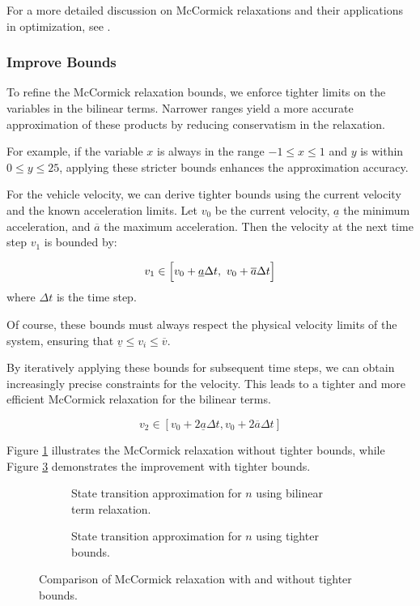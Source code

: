 For a more detailed discussion on McCormick relaxations and their applications in optimization, see
\cite{mccormick_computability_1976,belotti_branching_2009}.

\subsubsection{Improve Bounds}

To refine the McCormick relaxation bounds, we enforce tighter limits on the variables in the bilinear terms.
Narrower ranges yield a more accurate approximation of these products by reducing conservatism in the relaxation.

For example, if the variable $ x $ is always in the range $-1 \leq x \leq 1$ and $ y $ is within $ 0 \leq y \leq 25 $, applying these stricter bounds
enhances the approximation accuracy.

For the vehicle velocity, we can derive tighter bounds using the current velocity and the known acceleration limits.
Let $ v_0 $ be the current velocity, $\underline{a}$ the minimum acceleration, and $\overline{a}$ the maximum acceleration.
Then the velocity at the next time step $ v_1 $ is bounded by:

\[ v_1 \in \Bigl[v_0 + \underline{a}\Delta t,\ v_0 +
		\overline{a}\Delta t\Bigr] \] where $ \Delta t $ is the time step.

Of course, these bounds must always respect the physical velocity limits of the system, ensuring that $\underline{v} \leq v_i \leq \overline{v}$.

By iteratively applying these bounds for subsequent time steps, we can obtain increasingly precise constraints for the velocity.
This leads to a tighter and more efficient McCormick relaxation for the bilinear terms.

\[ v_2 \in [v_0 + 2\underline{a} \Delta t, v_0 +
		2\overline{a} \Delta t] \]

Figure \ref{fig:mccormick_problem} illustrates the McCormick relaxation without tighter bounds, while Figure \ref{fig:mccormick_problem_better}
demonstrates the improvement with tighter bounds.

\begin{figure}[h]
	\centering
	\begin{subfigure}[b]{0.45\textwidth}
		\centering
		\resizebox{\textwidth}{!}{}
		\caption{State transition approximation for \( n \) using bilinear term relaxation.}
		\label{fig:mccormick_problem}
	\end{subfigure}
	\hfill
	\begin{subfigure}[b]{0.45\textwidth}
		\centering
		\resizebox{\textwidth}{!}{}
		\caption{State transition approximation for \( n \) using tighter bounds.}
		\label{fig:mccormick_problem_better}
	\end{subfigure}
	\caption{Comparison of McCormick relaxation with and without tighter bounds.}
\end{figure}

